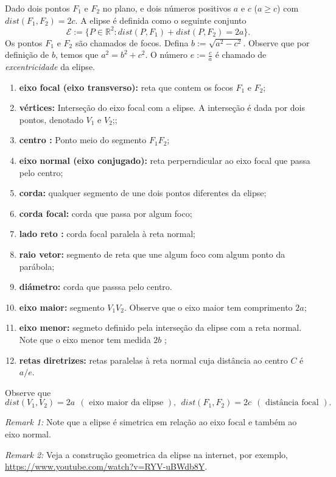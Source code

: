\documentclass{article}
\begin{document}
 Dado dois pontos $F_1$ e $F_2$ no plano, e dois números positivos $a$ e $c$ ($a\geq c$)
   com $dist(F_1,F_2)=2c$.  
   A elipse é definida como o seguinte conjunto 
   $$\mathcal{E}:=\{P \in \mathbb{R}^{2}: dist(P,F_1)+dist(P,F_2)=2a\}.$$
   Os pontos $F_1$ e $F_2$ são chamados de focos.
   Defina $b:=\sqrt{a^{2}-c^{2}}$. 
   Observe que por definição de $b$, 
   temos que $a^{2}=b^2+c^2$. 
   O número $e:=\frac{c}{a}$ é chamado 
   de {\it excentricidade} da elipse.
    \begin{enumerate}
      \item {\bf eixo focal (eixo transverso): } reta que contem os focos $F_1$ e $F_2$;
      \item {\bf vértices: } Interseção do eixo focal com a elipse.   A interseção é dada por dois pontos, denotado $V_1$ e $V_2$;;
      \item {\bf centro : } Ponto meio do segmento $F_1F_2$;
      \item {\bf eixo normal (eixo conjugado): } reta perperndicular ao eixo focal que passa pelo centro; 
      \item {\bf corda: } qualquer segmento de une dois pontos diferentes da elipse;
      \item {\bf corda focal: } corda que passa por algum foco;
      \item {\bf lado reto : } corda focal paralela à reta normal;
      \item {\bf raio vetor: } segmento de reta que une algum 
      foco com algum ponto da parábola;
      \item {\bf diámetro: } corda que passsa pelo centro.
      \item {\bf eixo maior: } segmento $V_1V_2$. 
      Observe que o eixo maior tem comprimento $2a$;
      \item {\bf eixo menor: } segmeto definido pela interseção da elipse 
      com a reta normal. Note que o eixo menor tem medida $2b$ ;
      \item {\bf retas diretrizes: }  retas paralelas à reta normal 
      cuja distância ao centro $C$ é $a/e$.
     \end{enumerate}
     Observe que 
     $$ dist(V_1,V_2)=2a \ \ (\text{ eixo maior da elipse }), \ \ 
        dist(F_1,F_2)=2c \ \ (\text{ distância focal }).$$
 
 {\it Remark 1: }Note que a elipse é simetrica em relação ao eixo focal e também ao eixo normal. 
 
 {\it Remark 2: } Veja a 
 construção geometrica da elipse na internet, 
 por exemplo, 
 \url{https://www.youtube.com/watch?v=RYV-uBWdb8Y}.
  
\end{document}
